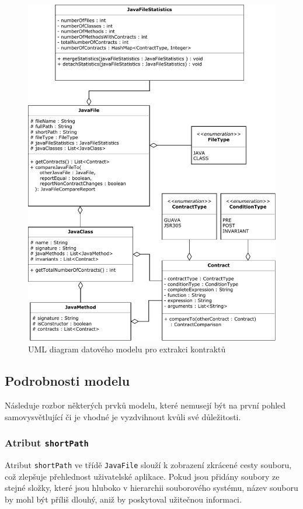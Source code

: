 				\begin{figure}[!htb]
						\centering
						\includegraphics[width=1\textwidth]{img/modelExtractorDiagram.pdf}
						\caption[modelExtractorDiagram]{UML diagram datového modelu pro extrakci kontraktů}
						\label{modelExtractorDiagram}
					\endminipage\hfill
				\end{figure}				
			
			\subsection{Podrobnosti modelu}
				Následuje rozbor některých prvků modelu, které nemusejí být na první pohled samovysvětlující či je vhodné je vyzdvihnout kvůli své důležitosti.
				
				\subsubsection{Atribut \texttt{shortPath}}				
					Atribut \texttt{shortPath} ve třídě \texttt{JavaFile} slouží k zobrazení zkrácené cesty souboru, což zlepšuje přehlednost uživatelské aplikace. Pokud jsou přidány soubory ze stejné složky, které jsou hluboko v hierarchii souborového systému, název souboru by mohl být příliš dlouhý, aniž by poskytoval užitečnou informaci.\\
					
